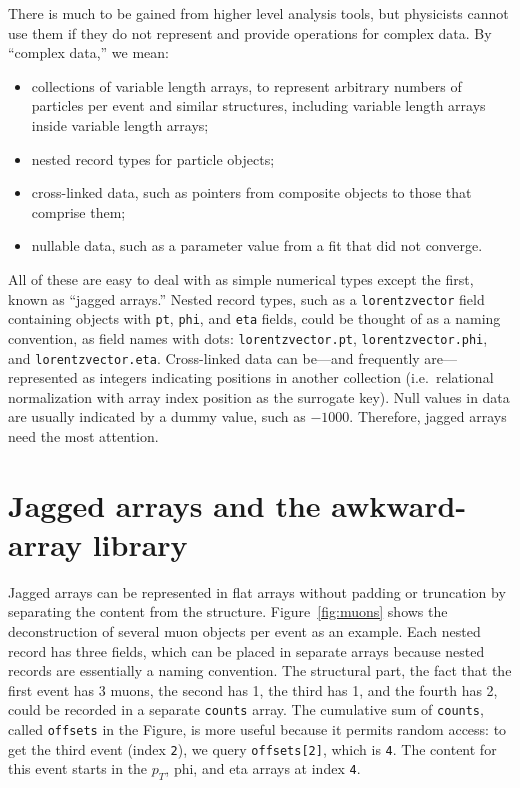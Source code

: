 \documentclass[a4paper]{jpconf}
\begin{document}
There is much to be gained from higher level analysis tools, but physicists cannot use them if they do not represent and provide operations for complex data. By ``complex data,'' we mean:
\begin{itemize}
\item collections of variable length arrays, to represent arbitrary numbers of particles per event and similar structures, including variable length arrays inside variable length arrays;
\item nested record types for particle objects;
\item cross-linked data, such as pointers from composite objects to those that comprise them;
\item nullable data, such as a parameter value from a fit that did not converge.
\end{itemize}

All of these are easy to deal with as simple numerical types except the first, known as ``jagged arrays.'' Nested record types, such as a {\tt lorentzvector} field containing objects with {\tt pt}, {\tt phi}, and {\tt eta} fields, could be thought of as a naming convention, as field names with dots: {\tt lorentzvector.pt}, {\tt lorentzvector.phi}, and {\tt lorentzvector.eta}. Cross-linked data can be---and frequently are---represented as integers indicating positions in another collection (i.e.\ relational normalization with array index position as the surrogate key). Null values in data are usually indicated by a dummy value, such as $-1000$. Therefore, jagged arrays need the most attention.

\section{Jagged arrays and the awkward-array library}

Jagged arrays can be represented in flat arrays without padding or truncation by separating the content from the structure. Figure~\ref{fig:muons} shows the deconstruction of several muon objects per event as an example. Each nested record has three fields, which can be placed in separate arrays because nested records are essentially a naming convention. The structural part, the fact that the first event has 3 muons, the second has 1, the third has 1, and the fourth has 2, could be recorded in a separate {\tt counts} array. The cumulative sum of {\tt counts}, called {\tt offsets} in the Figure, is more useful because it permits random access: to get the third event (index {\tt 2}), we query {\tt offsets[2]}, which is {\tt 4}. The content for this event starts in the $p_T$, phi, and eta arrays at index {\tt 4}.
\end{document}
